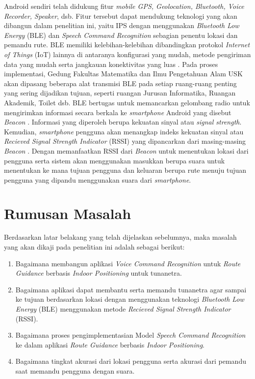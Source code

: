 \par Android sendiri telah didukung fitur \textit{mobile GPS, Geolocation, Bluetooth, Voice Recorder, Speaker}, dsb. Fitur tersebut dapat mendukung teknologi yang akan dibangun dalam penelitian ini, yaitu IPS dengan menggunakan \textit{Bluetooth Low Energy} (BLE) dan \textit{Speech Command Recognition} sebagian penentu lokasi dan pemandu rute. BLE memiliki kelebihan-kelebihan dibandingkan protokol \textit{Internet of Things} (IoT) lainnya di antaranya konfigurasi yang mudah, metode pengiriman data yang mudah serta jangkauan konektivitas yang luas \citep{puspitasari2020}. Pada proses implementasi, Gedung Fakultas Matematika dan Ilmu Pengetahuan Alam USK akan dipasang beberapa alat transmisi BLE pada setiap ruang-ruang penting yang sering dijadikan tujuan, seperti ruangan Jurusan Informatika, Ruangan Akademik, Toilet dsb. BLE bertugas untuk memancarkan gelombang radio untuk mengirimkan informasi secara berkala ke \textit{smartphone} Android yang disebut \textit{Beacon} \citep{lin2018interactive}. Informasi yang diperoleh berupa kekuatan sinyal atau \textit{signal strength}. Kemudian, \textit{smartphone} pengguna akan menangkap indeks kekuatan sinyal atau \textit{Recieved Signal Strength Indicator} (RSSI) yang dipancarkan dari masing-masing \textit{Beacon} \citep{li2018indoor}. Dengan memanfaatkan RSSI dari \textit{Beacon} untuk menentukan lokasi dari pengguna serta sistem akan menggunakan masukkan berupa suara untuk menentukan ke mana tujuan pengguna dan keluaran berupa rute menuju tujuan pengguna yang dipandu menggunakan suara dari \textit{smartphone}.


\fancyhf{} 
\fancyfoot[R]{\thepage}

\section{Rumusan Masalah}
Berdasarkan latar belakang yang telah dijelaskan sebelumnya, maka masalah yang akan dikaji pada penelitian ini adalah sebagai berikut:
\begin{enumerate}
	\item Bagaimana membangun aplikasi \textit{Voice Command Recognition} untuk \textit{Route Guidance} berbasis \textit{Indoor Positioning} untuk tunanetra.
	\item Bagaimana aplikasi dapat membantu serta memandu tunanetra agar sampai ke tujuan berdasarkan lokasi dengan menggunakan teknologi \textit{Bluetooth Low Energy }(BLE) menggunakan metode \textit{Recieved Signal Strength Indicator} (RSSI).
	\item Bagaimana proses pengimplementasian Model \textit{Speech Command Recognition} ke dalam aplikasi \textit{Route Guidance} berbasis \textit{Indoor Positioning}.
	\item Bagaimana tingkat akurasi dari lokasi pengguna serta akurasi dari pemandu saat memandu pengguna dengan suara.
\end{enumerate}

